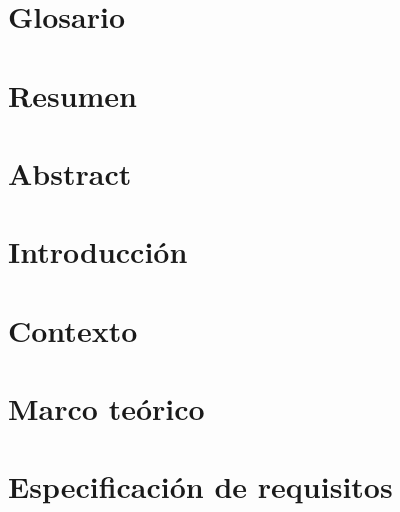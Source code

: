 \documentclass[a4paper,oneside,12pt,titlepage]{report}
\begin{document}
    
    


    

    \tableofcontents
    \newpage
    \listoftables
    \newpage
    \listoffigures
    \newpage
    \lstlistoflistings
    \newpage

    \setlength{\parskip}{\baselineskip} 
    \pagestyle{long}

    \chapter*{Glosario}
    
    \newpage
    \chapter*{Resumen}
    
    \chapter*{Abstract}
    
    
    

    \chapter{Introducción}
    
    \newpage

    \chapter{Contexto}
    
    \newpage

    \chapter{Marco teórico}
    
    \newpage

    \chapter{Especificación de requisitos}
    
    \newpage
\end{document}
